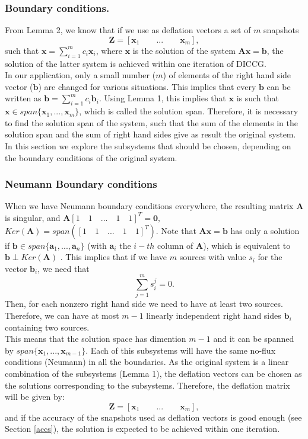\documentclass[12pt]{article}
\begin{document}
\subsubsection{Boundary conditions.}
From Lemma 2, we know that if we use as deflation vectors a set of $m$ snapshots $$\mathbf{Z}=[\mathbf{x}_1\qquad ...\qquad \mathbf{x}_m],$$ such that $\mathbf{x}=\sum_{i=1}^m {c}_i\mathbf{x}_i$, where $\mathbf{x}$ is the solution of the system $\mathbf{A}\mathbf{x}=\mathbf{b}$, the solution of the latter system is achieved within one iteration of DICCG. \\
In our application, only a small number ($m$) of elements of the right hand side vector ($\mathbf{b}$)
are changed for various situations. This implies that every $\mathbf{b}$ can be written as $\mathbf{b}=\sum_{i=1}^m {c}_i\mathbf{b}_i.$ Using Lemma 1, this implies that $\mathbf{x}$ is such that 
$\mathbf{x}\in span\{ \mathbf{x}_1, ...,  \mathbf{x}_m\}$, which is called the solution span.
Therefore, it is necessary to find the solution span of the system, such that the sum of the elements in the solution span and the sum of right hand sides give as result the original system. In this section we explore the subsystems that should be chosen, depending on the boundary conditions of the original system. 
\subsubsection*{{Neumann Boundary conditions}}
When we have Neumann boundary conditions everywhere, the resulting matrix $\mathbf{A}$ is singular, and
$\mathbf{A}[1\quad 1\quad ...\quad 1\quad 1]^T=\mathbf{0},$ $Ker(\mathbf{A})=span([1\quad 1\quad ...\quad 1\quad 1]^T)$. 
Note that $\mathbf{A}\mathbf{x}=\mathbf{b}$ has only a solution if $\mathbf{b}\in span\{\mathbf{a}_1,...,\mathbf{a}_n\}$ (with $\mathbf{a}_i$ the $i-th$ column of $\mathbf{A}$), which is equivalent to $\mathbf{b}\perp Ker(\mathbf{A}) $ \cite{Strang09}.
This implies that if we have $m$ sources with value ${s}_i$ for the vector $\mathbf{b}_i$, we need that 
$$\sum_{j=1}^ m {s}^{j}_i=0.$$
Then, for each nonzero  right hand side we need to have at least two sources. Therefore, we can have at most $m-1$ linearly independent right hand sides $\mathbf{b}_{i}$ containing two sources.\\
This means that the solution space has dimention $m-1$ and it can be spanned by $ span\{\mathbf{x}_1,...,\mathbf{x}_{m-1}\}$.
Each of this subsystems will have the same no-flux conditions (Neumann) in all the boundaries.
As the original system is a linear combination of the subsystems (Lemma 1), the deflation vectors can be chosen as the solutions corresponding to the subsystems. Therefore, the deflation matrix will be given by:
$$\mathbf{Z}=[\mathbf{x}_1\qquad ...\qquad \mathbf{x}_m],$$
and if the accuracy of the snapshots used as deflation vectors is good enough (see Section \ref{accs}), the solution is expected to be achieved within one iteration. 
\end{document}

